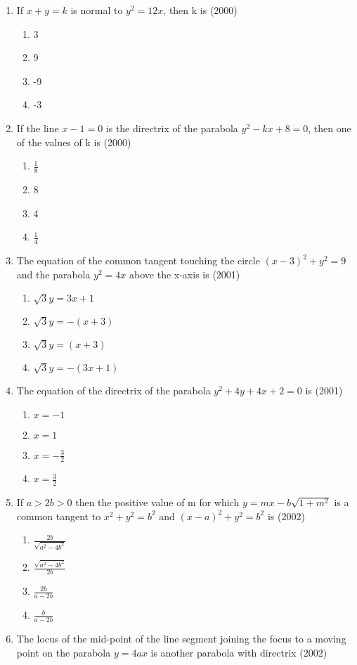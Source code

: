 \documentclass[12pt]{article}
\begin{document}
\begin{enumerate}
\begin{enumerate}
\end{enumerate}
\item If $x+y=k$ is normal to $y^2=12x$, then k is (2000)
\begin{enumerate}
\item 3
\item 9
\item -9
\item -3
\end{enumerate}
\item If the line $x-1=0$ is the directrix of the parabola $y^2-kx+8=0$, then one of the values of k is (2000)
\begin{enumerate}
\item $\frac{1}{8}$
\item 8
\item 4 
\item $\frac{1}{4}$
\end{enumerate}
\item The equation of the common tangent touching the circle $(x-3)^2+y^2=9$ and the parabola $y^2=4x$ above the x-axis is (2001)
\begin{enumerate}
\item $\sqrt{3}y=3x+1$
\item $\sqrt{3}y=-(x+3)$
\item $\sqrt{3}y=(x+3)$
\item $\sqrt{3}y=-(3x+1)$
\end{enumerate}
\item  The equation of the directrix of the parabola $y^2+4y+4x+2=0$ is (2001)
\begin{enumerate}
\item $x=-1$
\item $x=1$
\item $x=-\frac{3}{2}$
\item $x=\frac{3}{2}$
\end{enumerate}
\item If $a>2b>0$ then the positive value of m for which $y=mx-b\sqrt{1+m^2}$ is a common tangent to $x^2+y^2=b^2$ and $(x-a)^2+y^2=b^2$ is (2002)
\begin{enumerate}
\item $\frac{2b}{\sqrt{a^2-4b^2}}$
\item $\frac{\sqrt{a^2-4b^2}}{2b}$
\item $\frac{2b}{a-2b}$
\item $\frac{b}{a-2b}$
\end{enumerate}
\item The locus of the mid-point of the line segment joining the focus to a moving point on the parabola $y=4ax$ is another parabola with directrix (2002)

\end{enumerate}
\end{document}
